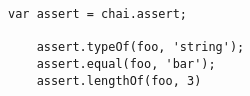 
\begin{lstlisting}[basicstyle=\basicstyle]
    var assert = chai.assert;

	assert.typeOf(foo, 'string');
	assert.equal(foo, 'bar');
	assert.lengthOf(foo, 3)
\end{lstlisting}
